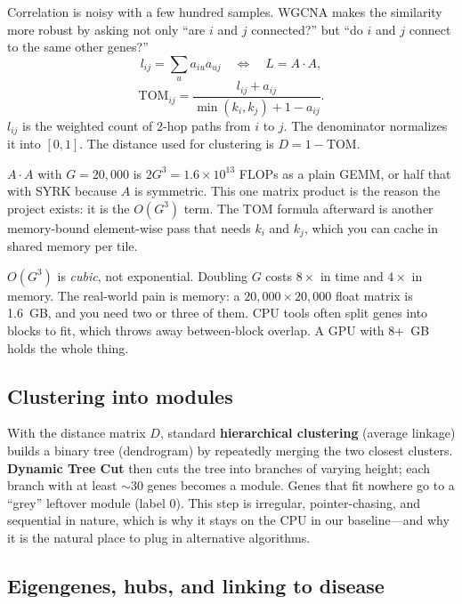 \documentclass[11pt]{article}
\begin{document}
Correlation is noisy with a few hundred samples. WGCNA makes the similarity
more robust by asking not only ``are $i$ and $j$ connected?'' but ``do $i$
and $j$ connect to the same other genes?''
\[
l_{ij} = \sum_{u} a_{iu} a_{uj} \quad\Longleftrightarrow\quad L = A\cdot A,
\]
\[
\text{TOM}_{ij} = \frac{l_{ij} + a_{ij}}{\min(k_i,k_j) + 1 - a_{ij}}.
\]
$l_{ij}$ is the weighted count of 2-hop paths from $i$ to $j$. The
denominator normalizes it into $[0,1]$. The distance used for clustering is
$D = 1 - \text{TOM}$.

\begin{analogy}
$A\cdot A$ with $G=20{,}000$ is $2G^3 = 1.6\times10^{13}$ FLOPs as a plain
GEMM, or half that with SYRK because $A$ is symmetric. This one matrix
product is the reason the project exists: it is the $O(G^3)$ term. The TOM
formula afterward is another memory-bound element-wise pass that needs
$k_i$ and $k_j$, which you can cache in shared memory per tile.
\end{analogy}

\begin{pitfall}
$O(G^3)$ is \emph{cubic}, not exponential. Doubling $G$ costs $8\times$ in
time and $4\times$ in memory. The real-world pain is memory: a
$20{,}000\times20{,}000$ float matrix is 1.6~GB, and you need two or three of
them. CPU tools often split genes into blocks to fit, which throws away
between-block overlap. A GPU with 8+~GB holds the whole thing.
\end{pitfall}

\subsection{Clustering into modules}

With the distance matrix $D$, standard \textbf{hierarchical clustering}
(average linkage) builds a binary tree (dendrogram) by repeatedly merging the
two closest clusters. \textbf{Dynamic Tree Cut} then cuts the tree into
branches of varying height; each branch with at least $\sim$30 genes becomes a
module. Genes that fit nowhere go to a ``grey'' leftover module (label 0).
This step is irregular, pointer-chasing, and sequential in nature, which is why
it stays on the CPU in our baseline---and why it is the natural place to plug
in alternative algorithms.

\subsection{Eigengenes, hubs, and linking to disease}
\end{document}
